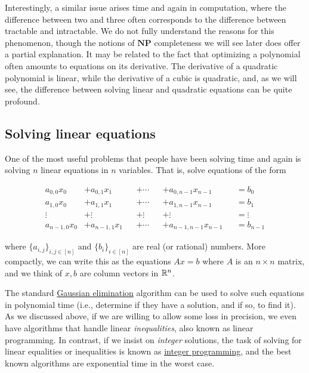 Interestingly, a similar issue arises time and again in computation,
where the difference between two and three often corresponds to the
difference between tractable and intractable. We do not fully understand
the reasons for this phenomenon, though the notions of \(\mathbf{NP}\)
completeness we will see later does offer a partial explanation. It may
be related to the fact that optimizing a polynomial often amounts to
equations on its derivative. The derivative of a quadratic polynomial is
linear, while the derivative of a cubic is quadratic, and, as we will
see, the difference between solving linear and quadratic equations can
be quite profound.

\subsection{Solving linear equations}\label{Solving-linear-equations}

One of the most useful problems that people have been solving time and
again is solving \(n\) linear equations in \(n\) variables. That is,
solve equations of the form

\[
\begin{aligned}
a_{0,0}x_0 &+ a_{0,1}x_1 &&+ \cdots &&+ a_{0,{n-1}}x_{n-1} &&= b_0 \\
a_{1,0}x_0 &+ a_{1,1}x_1 &&+ \cdots &&+ a_{1,{n-1}}x_{n-1} &&= b_1 \\
\vdots     &+ \vdots     &&+  \vdots &&+ \vdots              &&= \vdots \\
a_{n-1,0}x_0 &+ a_{n-1,1}x_1 &&+ \cdots &&+ a_{n-1,{n-1}}x_{n-1} &&= b_{n-1}
\end{aligned}
\]

where \(\{ a_{i,j} \}_{i,j \in [n]}\) and \(\{ b_i \}_{i\in [n]}\) are
real (or rational) numbers. More compactly, we can write this as the
equations \(Ax = b\) where \(A\) is an \(n\times n\) matrix, and we
think of \(x,b\) are column vectors in \({\mathbb{R}}^n\).

The standard
\href{https://en.wikipedia.org/wiki/Gaussian_elimination}{Gaussian
elimination} algorithm can be used to solve such equations in polynomial
time (i.e., determine if they have a solution, and if so, to find it).
As we discussed above, if we are willing to allow some loss in
precision, we even have algorithms that handle linear
\emph{inequalities}, also known as linear programming. In contrast, if
we insist on \emph{integer} solutions, the task of solving for linear
equalities or inequalities is known as
\href{https://en.wikipedia.org/wiki/Integer_programming}{integer
programming}, and the best known algorithms are exponential time in the
worst case.

